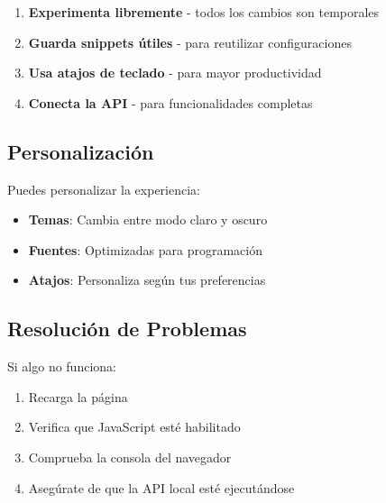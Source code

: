 \documentclass[
  11pt,
  letterpaper,
  oneside,
  openany]{scrbook}
\providecommand{\tightlist}{%
  \setlength{\itemsep}{0pt}\setlength{\parskip}{0pt}}
\begin{document}
\begin{tcolorbox}[enhanced jigsaw, toprule=.15mm, bottomrule=.15mm, opacityback=0, coltitle=black, rightrule=.15mm, colframe=quarto-callout-note-color-frame, titlerule=0mm, opacitybacktitle=0.6, left=2mm, colback=white, bottomtitle=1mm, arc=.35mm, leftrule=.75mm, title=\textcolor{quarto-callout-note-color}{\faInfo}\hspace{0.5em}{Mejores Prácticas}, colbacktitle=quarto-callout-note-color!10!white, breakable, toptitle=1mm]

\begin{enumerate}
\def\labelenumi{\arabic{enumi}.}
\tightlist
\item
  \textbf{Experimenta libremente} - todos los cambios son temporales
\item
  \textbf{Guarda snippets útiles} - para reutilizar configuraciones
\item
  \textbf{Usa atajos de teclado} - para mayor productividad
\item
  \textbf{Conecta la API} - para funcionalidades completas
\end{enumerate}

\end{tcolorbox}

\subsection{Personalización}\label{personalizaciuxf3n}

Puedes personalizar la experiencia:

\begin{itemize}
\tightlist
\item
  \textbf{Temas}: Cambia entre modo claro y oscuro
\item
  \textbf{Fuentes}: Optimizadas para programación
\item
  \textbf{Atajos}: Personaliza según tus preferencias
\end{itemize}

\subsection{Resolución de Problemas}\label{resoluciuxf3n-de-problemas}

Si algo no funciona:

\begin{enumerate}
\def\labelenumi{\arabic{enumi}.}
\tightlist
\item
  Recarga la página
\item
  Verifica que JavaScript esté habilitado
\item
  Comprueba la consola del navegador
\item
  Asegúrate de que la API local esté ejecutándose
\end{enumerate}
\end{document}
